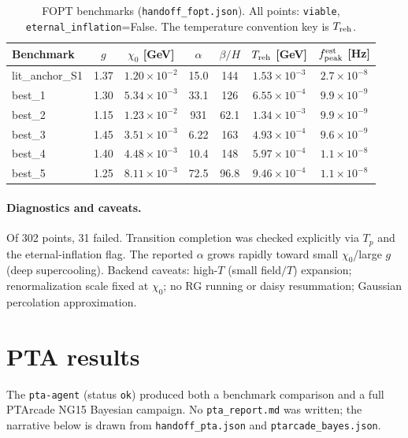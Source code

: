 \documentclass[11pt]{article}
\newcommand{\chizero}{\chi_0}
\begin{document}
\begin{table}[h]
\centering
\small
\begin{tabular}{@{}lcccccc@{}}
\toprule
Benchmark & $g$ & $\chizero$ [GeV] & $\alpha$ & $\beta/H$ & $T_{\rm reh}$ [GeV] & $f_{\rm peak}^{\rm est}$ [Hz] \\
\midrule
lit\_anchor\_S1 & 1.37 & $1.20\!\times\!10^{-2}$ & 15.0 & 144 & $1.53\!\times\!10^{-3}$ & $2.7\!\times\!10^{-8}$ \\
best\_1 & 1.30 & $5.34\!\times\!10^{-3}$ & 33.1 & 126 & $6.55\!\times\!10^{-4}$ & $9.9\!\times\!10^{-9}$ \\
best\_2 & 1.15 & $1.23\!\times\!10^{-2}$ & 931 & 62.1 & $1.34\!\times\!10^{-3}$ & $9.9\!\times\!10^{-9}$ \\
best\_3 & 1.45 & $3.51\!\times\!10^{-3}$ & 6.22 & 163 & $4.93\!\times\!10^{-4}$ & $9.6\!\times\!10^{-9}$ \\
best\_4 & 1.40 & $4.48\!\times\!10^{-3}$ & 10.4 & 148 & $5.97\!\times\!10^{-4}$ & $1.1\!\times\!10^{-8}$ \\
best\_5 & 1.25 & $8.11\!\times\!10^{-3}$ & 72.5 & 96.8 & $9.46\!\times\!10^{-4}$ & $1.1\!\times\!10^{-8}$ \\
\bottomrule
\end{tabular}
\caption{FOPT benchmarks (\texttt{handoff\_fopt.json}). All points: \texttt{viable},
\texttt{eternal\_inflation}=False. The temperature convention key is $T_{\rm reh}$.}
\label{tab:fopt}
\end{table}

\paragraph{Diagnostics and caveats.} Of 302 points, 31 failed. Transition completion was checked
explicitly via $T_p$ and the eternal-inflation flag. The reported $\alpha$ grows rapidly toward small
$\chizero$/large $g$ (deep supercooling). Backend caveats: high-$T$ (small field$/T$) expansion;
renormalization scale fixed at $\chizero$; no RG running or daisy resummation; Gaussian percolation
approximation.

\section{PTA results}
\label{sec:pta}
The \texttt{pta-agent} (status \texttt{ok}) produced both a benchmark comparison and a full PTArcade
NG15 Bayesian campaign. No \texttt{pta\_report.md} was written; the narrative below is drawn from
\texttt{handoff\_pta.json} and \texttt{ptarcade\_bayes.json}.
\end{document}
